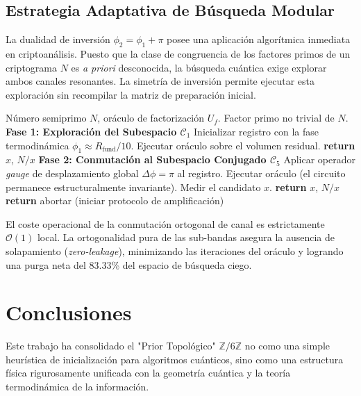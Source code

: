 \documentclass[12pt,a4paper]{article}
\theoremstyle{plain}
\theoremstyle{definition}
\theoremstyle{remark}
\begin{document}
\subsection{Estrategia Adaptativa de Búsqueda Modular}
\label{subsec:estrategia_adaptativa}

La dualidad de inversión $\phi_2 = \phi_1 + \pi$ posee una aplicación algorítmica inmediata en criptoanálisis. Puesto que la clase de congruencia de los factores primos de un criptograma $N$ es \textit{a priori} desconocida, la búsqueda cuántica exige explorar ambos canales resonantes. La simetría de inversión permite ejecutar esta exploración sin recompilar la matriz de preparación inicial.

\begin{algorithm}[H]
\caption{Estrategia Adaptativa de Búsqueda Modular (TSM)}
\label{alg:estrategia}
\begin{algorithmic}[1]
\Require Número semiprimo $N$, oráculo de factorización $U_f$.
\Ensure Factor primo no trivial de $N$.
\Statex
\State \textbf{Fase 1: Exploración del Subespacio $\mathcal{C}_1$}
\State Inicializar registro con la fase termodinámica $\phi_1 \approx R_{\text{fund}}/10$.
\State Ejecutar oráculo sobre el volumen residual.
    \State \textbf{return} $x$, $N/x$
\EndIf
\Statex
\State \textbf{Fase 2: Conmutación al Subespacio Conjugado $\mathcal{C}_5$}
\State Aplicar operador \textit{gauge} de desplazamiento global $\Delta\phi = \pi$ al registro.
\State Ejecutar oráculo (el circuito permanece estructuralmente invariante).
\State Medir el candidato $x$.
    \State \textbf{return} $x$, $N/x$
\Else
    \State \textbf{return} abortar (iniciar protocolo de amplificación)
\EndIf
\end{algorithmic}
\end{algorithm}

El coste operacional de la conmutación ortogonal de canal es estrictamente $\mathcal{O}(1)$ local. La ortogonalidad pura de las sub-bandas asegura la ausencia de solapamiento (\textit{zero-leakage}), minimizando las iteraciones del oráculo y logrando una purga neta del 83.33\% del espacio de búsqueda ciego.

\section{Conclusiones}

Este trabajo ha consolidado el "Prior Topológico" $\mathbb{Z}/6\mathbb{Z}$ no como una simple heurística de inicialización para algoritmos cuánticos, sino como una estructura física rigurosamente unificada con la geometría cuántica y la teoría termodinámica de la información. 
\end{document}
